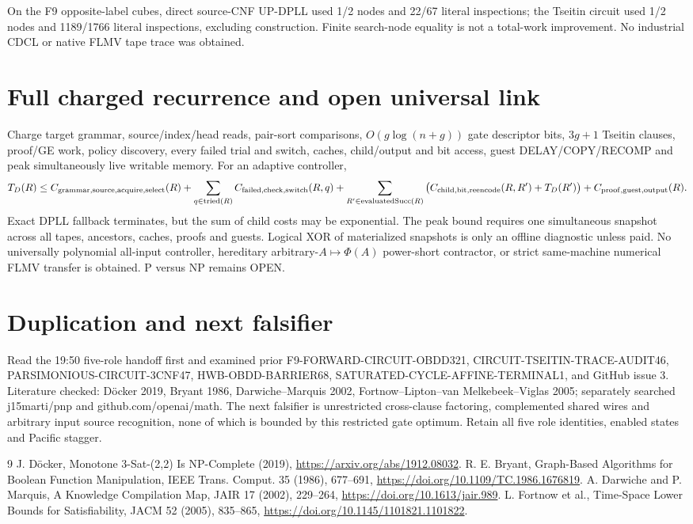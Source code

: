 \documentclass[11pt]{article}
\begin{document}
On the F9 opposite-label cubes, direct source-CNF UP-DPLL used 1/2 nodes and 22/67 literal inspections; the Tseitin circuit used 1/2 nodes and 1189/1766 literal inspections, excluding construction. Finite search-node equality is not a total-work improvement. No industrial CDCL or native FLMV tape trace was obtained.

\section{Full charged recurrence and open universal link}
Charge target grammar, source/index/head reads, pair-sort comparisons, $O(g\log(n+g))$ gate descriptor bits, $3g+1$ Tseitin clauses, proof/GE work, policy discovery, every failed trial and switch, caches, child/output and bit access, guest DELAY/COPY/RECOMP and peak simultaneously live writable memory. For an adaptive controller,
\[
T_D(R)\le C_{\rm grammar,source,acquire,select}(R)
+\sum_{q\in{\rm tried}(R)}C_{\rm failed,check,switch}(R,q)
+\sum_{R'\in{\rm evaluatedSucc}(R)}\big(C_{\rm child,bit,reencode}(R,R')+T_D(R')\big)
+C_{\rm proof,guest,output}(R).
\]
Exact DPLL fallback terminates, but the sum of child costs may be exponential. The peak bound requires one simultaneous snapshot across all tapes, ancestors, caches, proofs and guests. Logical XOR of materialized snapshots is only an offline diagnostic unless paid. No universally polynomial all-input controller, hereditary arbitrary-$A\mapsto\Phi(A)$ power-short contractor, or strict same-machine numerical FLMV transfer is obtained. P versus NP remains OPEN.

\section{Duplication and next falsifier}
Read the 19:50 five-role handoff first and examined prior F9-FORWARD-CIRCUIT-OBDD321, CIRCUIT-TSEITIN-TRACE-AUDIT46, PARSIMONIOUS-CIRCUIT-3CNF47, HWB-OBDD-BARRIER68, SATURATED-CYCLE-AFFINE-TERMINAL1, and GitHub issue 3. Literature checked: D\"ocker 2019, Bryant 1986, Darwiche--Marquis 2002, Fortnow--Lipton--van Melkebeek--Viglas 2005; separately searched j15marti/pnp and github.com/openai/math. The next falsifier is unrestricted cross-clause factoring, complemented shared wires and arbitrary input source recognition, none of which is bounded by this restricted gate optimum. Retain all five role identities, enabled states and Pacific stagger.

\begin{thebibliography}{9}
 J. D\"ocker, Monotone 3-Sat-(2,2) Is NP-Complete (2019), \url{https://arxiv.org/abs/1912.08032}.
 R. E. Bryant, Graph-Based Algorithms for Boolean Function Manipulation, IEEE Trans. Comput. 35 (1986), 677--691, \url{https://doi.org/10.1109/TC.1986.1676819}.
 A. Darwiche and P. Marquis, A Knowledge Compilation Map, JAIR 17 (2002), 229--264, \url{https://doi.org/10.1613/jair.989}.
 L. Fortnow et al., Time-Space Lower Bounds for Satisfiability, JACM 52 (2005), 835--865, \url{https://doi.org/10.1145/1101821.1101822}.
\end{thebibliography}
\end{document}
